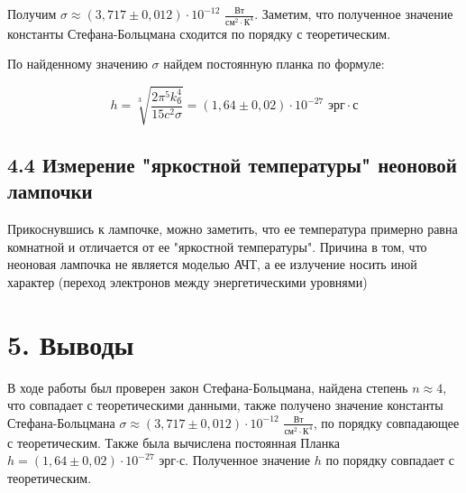 \documentclass[a4paper,12pt]{report}
\begin{document}
Получим $\sigma \approx (3,717 \pm 0,012) \cdot 10^{-12}$ $\frac{\text{Вт}}{\text{см}^{2}\cdot \text{К}^{4}}$. Заметим, что полученное значение константы Стефана-Больцмана сходится по порядку с теоретическим.

По найденному значению $\sigma$ найдем постоянную планка по формуле:

\begin{equation*}
    h = \sqrt[3]{\frac{2\pi^{5}{k_{\text{б}}^4}}{15c^2\sigma}} = (1,64 \pm 0,02)\cdot 10^{-27} \text{ эрг}\cdot\text{с}
\end{equation*}

\subsection*{4.4 Измерение "яркостной температуры" неоновой лампочки}
Прикоснувшись к лампочке, можно заметить, что ее температура примерно равна комнатной и отличается от ее "яркостной температуры". Причина в том, что неоновая лампочка не является моделью АЧТ, а ее излучение носить иной характер (переход электронов между энергетическими уровнями)


\section*{5. Выводы}
В ходе работы был проверен закон Стефана-Больцмана, найдена степень $n\approx 4$, что совпадает с теоретическими данными, также получено значение константы Стефана-Больцмана $\sigma \approx (3,717 \pm 0,012) \cdot 10^{-12}$ $\frac{\text{Вт}}{\text{см}^{2}\cdot \text{К}^{4}}$, по порядку совпадающее с теоретическим. Также была вычислена постоянная Планка $h = (1,64 \pm 0,02)\cdot 10^{-27}$ эрг$\cdot$с. Полученное значение $h$ по порядку совпадает с теоретическим.
\end{document}
